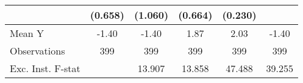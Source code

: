 {\begin{tabular}{l*{5}{c}}
            &     (0.658)         &     (1.060)         &     (0.664)         &     (0.230)         &                     \\
\midrule
Mean Y      &       -1.40         &       -1.40         &        1.87         &        2.03         &       -1.40         \\
Observations&         399         &         399         &         399         &         399         &         399         \\
Exc. Inst. F-stat&                     &      13.907         &      13.858         &      47.488         &      39.255         \\
\bottomrule
\end{tabular}
}
